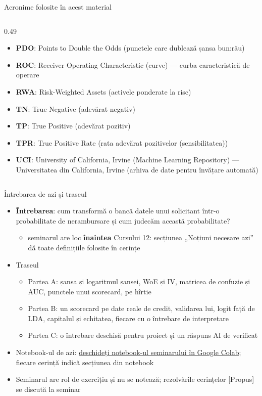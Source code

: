 \begin{frame}{Acronime folosite în acest material}
\begin{columns}[T]
\begin{column}{0.49\textwidth}
\begin{itemize}
    \item \textbf{PDO}: Points to Double the Odds (punctele care dublează șansa bun:rău)
    \item \textbf{ROC}: Receiver Operating Characteristic (curve) — curba caracteristică de operare
    \item \textbf{RWA}: Risk-Weighted Assets (activele ponderate la risc)
    \item \textbf{TN}: True Negative (adevărat negativ)
    \item \textbf{TP}: True Positive (adevărat pozitiv)
    \item \textbf{TPR}: True Positive Rate (rata adevărat pozitivelor (sensibilitatea))
    \item \textbf{UCI}: University of California, Irvine (Machine Learning Repository) — Universitatea din California, Irvine (arhiva de date pentru învățare automată)
\end{itemize}
\end{column}
\end{columns}
\end{frame}

\begin{frame}{Întrebarea de azi și traseul}
\itemsize{\small}
\begin{itemize}
    \item \textbf{Întrebarea}: cum transformă o bancă datele unui solicitant într-o probabilitate de nerambursare și cum judecăm această probabilitate?
    \begin{itemize}
        \item seminarul are loc \textbf{înaintea} Cursului 12: secțiunea „Noțiuni necesare azi” dă toate definițiile folosite în cerințe
    \end{itemize}
    \item Traseul
    \begin{itemize}
        \item Partea A: șansa și logaritmul șansei, WoE și IV, matricea de confuzie și AUC, punctele unui scorecard, pe hîrtie
        \item Partea B: un scorecard pe date reale de credit, validarea lui, logit față de LDA, capitalul și echitatea, fiecare cu o întrebare de interpretare
        \item Partea C: o întrebare deschisă pentru proiect și un răspuns AI de verificat
    \end{itemize}
    \item Notebook-ul de azi: \href{\nb}{deschideți notebook-ul seminarului în Google Colab}; fiecare cerință indică secțiunea din notebook
    \item Seminarul are rol de exercițiu și nu se notează; rezolvările cerințelor [Propus] se discută la seminar
\end{itemize}
\end{frame}

